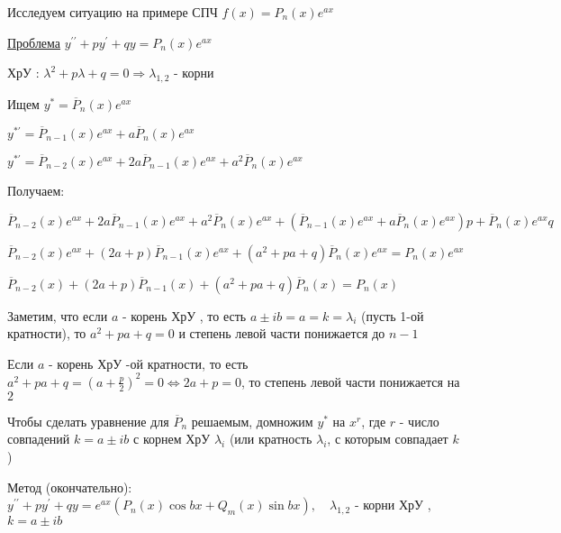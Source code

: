 \documentclass[12pt]{article}
\begin{document}
    Исследуем ситуацию на примере СПЧ $\displaystyle f(x) = P_n(x) e^{ax}$

    \underline{Проблема} $\displaystyle y^{\prime\prime} + py^\prime + qy = P_n(x)e^{ax}$

    ХрУ \Cat: $\displaystyle \lambda^2 + p\lambda + q = 0 \Longrightarrow \lambda_{1,2}$ - корни

    \vspace{5mm}
    Ищем $\displaystyle y^* = \overline{P}_n(x) e^{ax}$

    $\displaystyle y^{*\prime} = \overline{P}_{n - 1} (x) e^{ax} + a\overline{P}_n(x) e^{ax}$

    $\displaystyle y^{*\prime} = \overline{P}_{n - 2} (x) e^{ax} + 2a\overline{P}_{n - 1} (x) e^{ax} + a^2\overline{P}_n(x) e^{ax}$

    \vspace{5mm}
    Получаем:

    $\displaystyle \overline{P}_{n - 2} (x) e^{ax} + 2a\overline{P}_{n - 1} (x) e^{ax} + a^2\overline{P}_n(x) e^{ax} + (\overline{P}_{n - 1} (x) e^{ax} + a\overline{P}_n(x) e^{ax})p + \overline{P}_n(x) e^{ax} q $

    $\displaystyle \overline{P}_{n - 2} (x) e^{ax} + (2a + p)\overline{P}_{n - 1} (x) e^{ax} + (a^2 + pa + q)\overline{P}_n(x) e^{ax} = P_n(x) e^{ax}$

    $\displaystyle \overline{P}_{n - 2} (x) + (2a + p)\overline{P}_{n - 1} (x) + (a^2 + pa + q)\overline{P}_n(x) = P_n(x)$

    Заметим, что если $a$ - корень ХрУ \Cat, то есть $\displaystyle a \pm ib = a = k = \lambda_i$ (пусть 1-ой кратности), то $\displaystyle a^2 + pa + q = 0$ и степень
    левой части понижается до $n - 1$

    Если $a$ - корень ХрУ -ой кратности, то есть $\displaystyle a^2 + pa + q = \left(a + \frac{p}{2}\right)^2 = 0 \Longleftrightarrow 2a + p = 0$, то степень левой части понижается на $2$

    Чтобы сделать уравнение для $\displaystyle \overline{P}_n$ решаемым, домножим $\displaystyle y^*$ на $\displaystyle x^r$, где $r$ - число совпадений $k = a \pm ib$ с корнем ХрУ $\displaystyle \lambda_i$ (или кратность $\displaystyle \lambda_i$, с которым совпадает $k$)

    \vspace{5mm}
    Метод (окончательно): $\displaystyle y^{\prime\prime} + py^\prime + qy = e^{ax} (P_n(x)\cos bx + Q_m (x)\sin bx), \quad \lambda_{1,2}$ - корни ХрУ \Cat, $k = a \pm ib$
\end{document}
